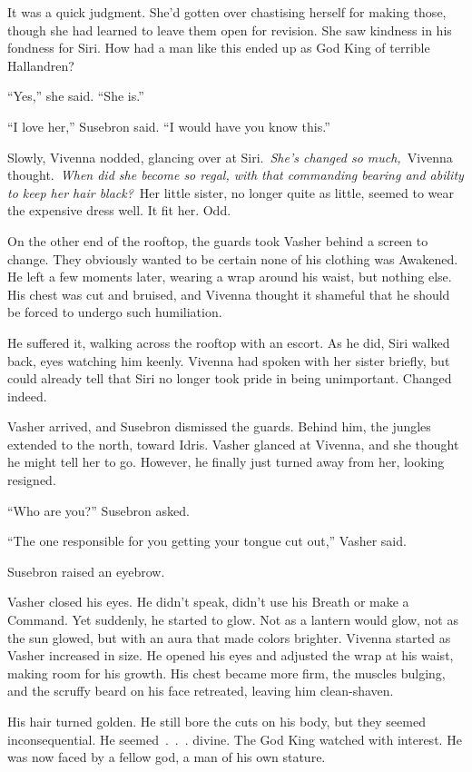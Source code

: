 It was a quick judgment. She’d gotten over chastising herself for making those, though she had learned to leave them open for revision. She saw kindness in his fondness for Siri. How had a man like this ended up as God King of terrible Hallandren?

“Yes,” she said. “She is.”

“I love her,” Susebron said. “I would have you know this.”

Slowly, Vivenna nodded, glancing over at Siri.~\textit{She’s changed so much,}~Vivenna thought.~\textit{When did she become so regal, with that commanding bearing and ability to keep her hair black?}~Her little sister, no longer quite as little, seemed to wear the expensive dress well. It fit her. Odd.

On the other end of the rooftop, the guards took Vasher behind a screen to change. They obviously wanted to be certain none of his clothing was Awakened. He left a few moments later, wearing a wrap around his waist, but nothing else. His chest was cut and bruised, and Vivenna thought it shameful that he should be forced to undergo such humiliation.

He suffered it, walking across the rooftop with an escort. As he did, Siri walked back, eyes watching him keenly. Vivenna had spoken with her sister briefly, but could already tell that Siri no longer took pride in being unimportant. Changed indeed.

Vasher arrived, and Susebron dismissed the guards. Behind him, the jungles extended to the north, toward Idris. Vasher glanced at Vivenna, and she thought he might tell her to go. However, he finally just turned away from her, looking resigned.

“Who are you?” Susebron asked.

“The one responsible for you getting your tongue cut out,” Vasher said.

Susebron raised an eyebrow.

Vasher closed his eyes. He didn’t speak, didn’t use his Breath or make a Command. Yet suddenly, he started to glow. Not as a lantern would glow, not as the sun glowed, but with an aura that made colors brighter. Vivenna started as Vasher increased in size. He opened his eyes and adjusted the wrap at his waist, making room for his growth. His chest became more firm, the muscles bulging, and the scruffy beard on his face retreated, leaving him clean-shaven.

His hair turned golden. He still bore the cuts on his body, but they seemed inconsequential. He seemed~.~.~. divine. The God King watched with interest. He was now faced by a fellow god, a man of his own stature.


